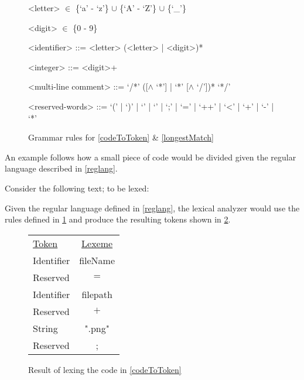 \begin{figure}[h!]
\begin{center}
\begin{grammar}

<letter>  $\in$ \{`a' - `z'\} $\cup$ \{`A' - `Z'\} $\cup$ \{`_'\}

<digit>  $\in$ \{0 - 9\}

<identifier> ::= <letter> (<letter> | <digit>)* 

<integer> ::= <digit>+

<multi-line comment> ::= `/*' ([$\wedge$ `*'] | `*' [$\wedge$ `/'])* `*/'

<reserved-words> ::= `(' | `)' | `{' | `}' | `;' | `=' | `++' | `<' | `+' | `-' | `*'

\end{grammar}
\caption{Grammar rules for \cref{codeToToken} \& \cref{longestMatch}\label{fig:grammar}}
\end{center}
\end{figure}

An example follows how a small piece of code would be divided given the regular
language described in \cref{reglang}.

\newpage

\begin{example} \label{codeToToken}$ $\\
Consider the following text; to be lexed:

Given the regular language defined in \cref{reglang}, the lexical analyzer would
use the rules defined in \cref{fig:grammar} and produce the resulting
tokens shown in \cref{fig:codeToToken}.

\begin{figure}[h!]
\begin{center}
\begin{tabular}{l c}
\underline{Token} & \underline{Lexeme}\\
Identifier & fileName\\
Reserved & $=$\\
Identifier & filepath\\
Reserved & $+$\\
String & ".png"\\
Reserved & ;
\end{tabular}
\end{center}
\caption{Result of lexing the code in \cref{codeToToken} \label{fig:codeToToken}}
\end{figure}
\end{example}

